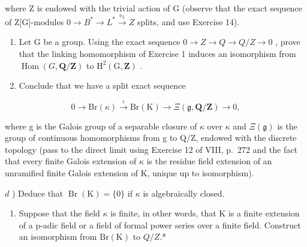 where Z is endowed with the trivial action of G (observe that the exact sequence of Z{[}G{]}-modules \(0 \rightarrow B^{*} \rightarrow L^{*} \xrightarrow{v_{L}} Z\) splits, and use Exercise 14).

\begin{enumerate}
\def\labelenumi{\alph{enumi})}
\setcounter{enumi}{1}
\item
  Let G be a group. Using the exact sequence \(0 \rightarrow Z \rightarrow Q \rightarrow Q/Z \rightarrow 0\) , prove that the linking homomorphism of Exercise 1 induces an isomorphism from \(\operatorname{Hom}(G, \mathbf{Q}/\mathbf{Z})\) to \(\mathrm{H}^{2}(\mathrm{G}, \mathbf{Z})\) .
\item
  Conclude that we have a split exact sequence
\end{enumerate}

\[
0 \to \mathrm{Br} (\kappa) \stackrel {\iota} {\to} \mathrm{Br} (\mathrm{K}) \to \Xi (\mathfrak {g}, \mathbf {Q} / \mathbf {Z}) \to 0,
\]

where g is the Galois group of a separable closure of \(\kappa\) over \(\kappa\) and \(\Xi(\mathfrak{g})\) is the group of continuous homomorphisms from g to Q/Z, endowed with the discrete topology (pass to the direct limit using Exercise 12 of VIII, p.~272 and the fact that every finite Galois extension of \(\kappa\) is the residue field extension of an unramified finite Galois extension of K, unique up to isomorphism).

\(d\) ) Deduce that \(\operatorname {Br}(\mathrm{K}) = \{0\}\) if \(\kappa\) is algebraically closed.

\begin{enumerate}
\def\labelenumi{\alph{enumi})}
\setcounter{enumi}{4}
\tightlist
\item
  Suppose that the field \(\kappa\) is finite, in other words, that K is a finite extension of a p-adic field or a field of formal power series over a finite field. Construct an isomorphism from \(\mathrm{Br}(\mathrm{K})\) to \(Q/Z\).*
\end{enumerate}

